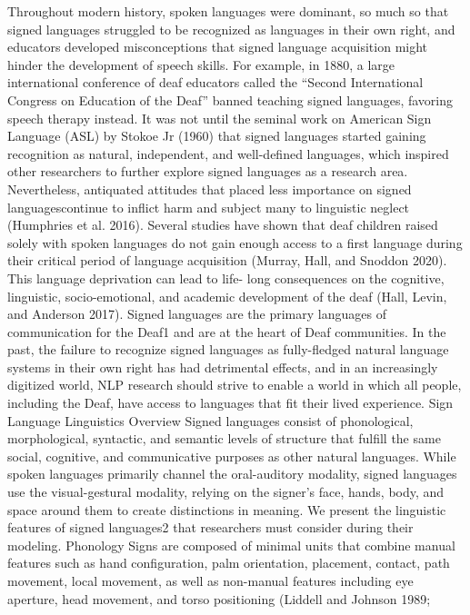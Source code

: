 Throughout modern history, spoken languages were dominant, so much so that signed
languages struggled to be recognized as languages in their own right, and educators
developed misconceptions that signed language acquisition might hinder the
development of speech skills. For example, in 1880, a large international conference of
deaf educators called the “Second International Congress on Education of the Deaf”
banned teaching signed languages, favoring speech therapy instead. It was not until the
seminal work on American Sign Language (ASL) by Stokoe Jr (1960) that signed languages
started gaining recognition as natural, independent, and well-defined languages, which
inspired other researchers to further explore signed languages as a research area.
Nevertheless, antiquated attitudes that placed less importance on signed languagescontinue to inflict harm and subject many to linguistic neglect (Humphries et al. 2016).
Several studies have shown that deaf children raised solely with spoken languages do not
gain enough access to a first language during their critical period of language
acquisition (Murray, Hall, and Snoddon 2020). This language deprivation can lead to life-
long consequences on the cognitive, linguistic, socio-emotional, and academic
development of the deaf (Hall, Levin, and Anderson 2017).
Signed languages are the primary languages of communication for the Deaf1 and are at
the heart of Deaf communities. In the past, the failure to recognize signed languages as
fully-fledged natural language systems in their own right has had detrimental effects, and
in an increasingly digitized world, NLP research should strive to enable a world in which
all people, including the Deaf, have access to languages that fit their lived experience.
Sign Language Linguistics Overview
Signed languages consist of phonological, morphological, syntactic, and semantic levels
of structure that fulfill the same social, cognitive, and communicative purposes as other
natural languages. While spoken languages primarily channel the oral-auditory modality,
signed languages use the visual-gestural modality, relying on the signer’s face, hands,
body, and space around them to create distinctions in meaning. We present the linguistic
features of signed languages2 that researchers must consider during their modeling.
Phonology
Signs are composed of minimal units that combine manual features such as hand configuration,
palm orientation, placement, contact, path movement, local movement, as well as non-manual
features including eye aperture, head movement, and torso positioning (Liddell and Johnson 1989;
